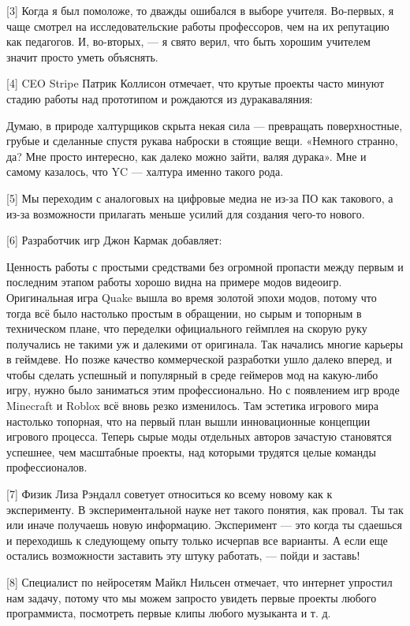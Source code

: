 \documentclass[ebook,12pt,oneside,openany]{memoir}
\begin{document}
[3] Когда я был помоложе, то дважды ошибался в выборе учителя. Во-первых, я чаще смотрел на исследовательские работы профессоров, чем на их репутацию как педагогов. И, во-вторых, — я свято верил, что быть хорошим учителем значит просто уметь объяснять. \newline

[4] CEO Stripe Патрик Коллисон отмечает, что крутые проекты часто минуют стадию работы над прототипом и рождаются из дуракаваляния: \newline

Думаю, в природе халтурщиков скрыта некая сила — превращать поверхностные, грубые и сделанные спустя рукава наброски в стоящие вещи. «Немного странно, да? Мне просто интересно, как далеко можно зайти, валяя дурака». Мне и самому казалось, что YC — халтура именно такого рода. \newline

[5] Мы переходим с аналоговых на цифровые медиа не из-за ПО как такового, а из-за возможности прилагать меньше усилий для создания чего-то нового. \newline

[6] Разработчик игр Джон Кармак добавляет:

Ценность работы с простыми средствами без огромной пропасти между первым и последним этапом работы хорошо видна на примере модов видеоигр. Оригинальная игра Quake вышла во время золотой эпохи модов, потому что тогда всё было настолько простым в обращении, но сырым и топорным в техническом плане, что переделки официального геймплея на скорую руку получались не такими уж и далекими от оригинала. Так начались многие карьеры в геймдеве. Но позже качество коммерческой разработки ушло далеко вперед, и чтобы сделать успешный и популярный в среде геймеров мод на какую-либо игру, нужно было заниматься этим профессионально. Но с появлением игр вроде Minecraft и Roblox всё вновь резко изменилось. Там эстетика игрового мира настолько топорная, что на первый план вышли инновационные концепции игрового процесса. Теперь сырые моды отдельных авторов зачастую становятся успешнее, чем масштабные проекты, над которыми трудятся целые команды профессионалов. \newline

[7] Физик Лиза Рэндалл советует относиться ко всему новому как к эксперименту. В экспериментальной науке нет такого понятия, как провал. Ты так или иначе получаешь новую информацию. Эксперимент — это когда ты сдаешься и переходишь к следующему опыту только исчерпав все варианты. А если еще остались возможности заставить эту штуку работать, — пойди и заставь! \newline

[8] Специалист по нейросетям Майкл Нильсен отмечает, что интернет упростил нам задачу, потому что мы можем запросто увидеть первые проекты любого программиста, посмотреть первые клипы любого музыканта и т. д.
\end{document}
